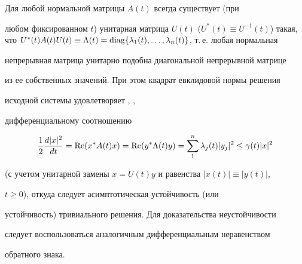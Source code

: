 \begin{pf}


Для любой нормальной матрицы $A(t)$ всегда \cite{8} существует (при 


любом фиксированном $t$) унитарная матрица $U(t)$ ($U^*(t)\equiv 


U^{-1}(t)$) такая, что $U^*(t)A(t)U(t)\equiv\Lambda(t)= 


\diag\{\lambda_1(t),\dotsc, \lambda_n(t)\}$, т.\,е. любая нормальная 


непрерывная матрица унитарно подобна диагональной непрерывной матрице 


из ее собственных значений. При этом квадрат евклидовой нормы решения 


исходной системы удовлетворяет \cite{2}, \cite{9}, \cite{10} 


дифференциальному соотношению


$$


\frac{1}{2}\frac{d|x|^2}{d t}=\re(x^*A(t)x)=


\re(y^*\Lambda(t)y)=\sum^n_1 \lambda_j(t)|y_j|^2\le


\gamma(t)|x|^2


$$


(с учетом унитарной замены $x=U(t)y$ и равенства $|x(t)|\equiv|y(t)|$, 


$t\ge0$), откуда следует асимптотическая устойчивость (или 


устойчивость) тривиального решения. Для доказательства неустойчивости 


следует воспользоваться аналогичным дифференциальным неравенством 


обратного знака.


\end{pf}





